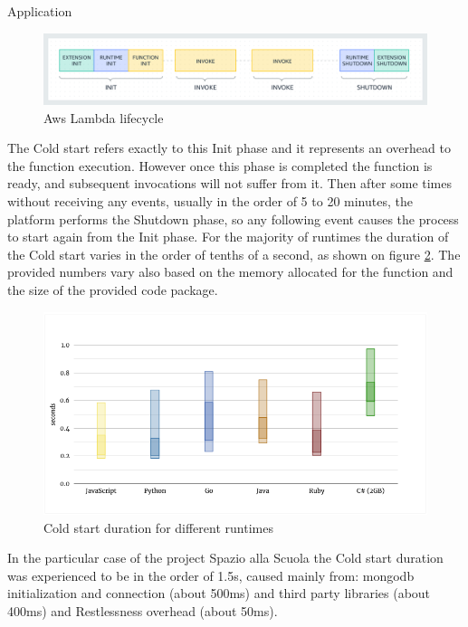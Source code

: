 \begin{chapter}{Application}
    \begin{figure}
        \centering
        \includegraphics[width=\linewidth]{source/images/aws-lambda-lifecycle.png}
        \caption{Aws Lambda lifecycle}
        \label{fig:aws_lambda_lifecycle}
    \end{figure}

    The Cold start refers exactly to this Init phase and it represents an overhead to the
    function execution. However once this phase is completed the function is ready,
    and subsequent invocations will not suffer from it. Then after some times without
    receiving any events, usually in the order of 5 to 20 minutes, the platform performs
    the Shutdown phase, so any following event causes the process to start again from
    the Init phase.
    For the majority of runtimes the duration of the Cold start varies in the order
    of tenths of a second, as shown on figure \ref{fig:cold_start_duration}. The provided
    numbers vary also based on the memory allocated for the function and the size of the
    provided code package.

    \begin{figure}
        \centering
        \includegraphics[width=\linewidth]{source/images/cold-start-duration.png}
        \caption{Cold start duration for different runtimes}
        \label{fig:cold_start_duration}
    \end{figure}

    In the particular case of the project Spazio alla Scuola the Cold start duration
    was experienced to be in the order of 1.5s, caused mainly from: mongodb
    initialization and connection (about 500ms) and third party libraries (about 400ms)
    and Restlessness overhead (about 50ms).


\end{chapter}
